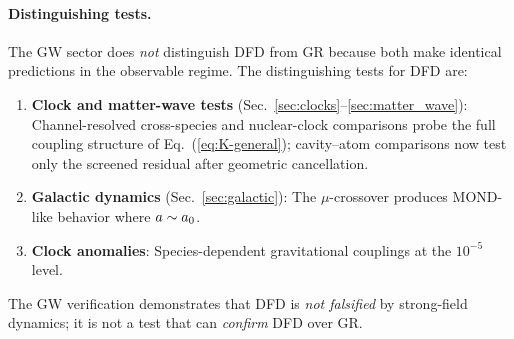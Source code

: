 \paragraph{Distinguishing tests.}
The GW sector does \textit{not} distinguish DFD from GR because both make identical predictions in the observable regime. The distinguishing tests for DFD are:

\begin{enumerate}
\item \textbf{Clock and matter-wave tests} (Sec.~\ref{sec:clocks}--\ref{sec:matter_wave}): Channel-resolved cross-species and nuclear-clock comparisons probe the full coupling structure of Eq.~(\ref{eq:K-general}); cavity--atom comparisons now test only the screened residual after geometric cancellation.

\item \textbf{Galactic dynamics} (Sec.~\ref{sec:galactic}): The $\mu$-crossover produces MOND-like behavior where $a \sim a_0$.

\item \textbf{Clock anomalies}: Species-dependent gravitational couplings at the $10^{-5}$ level.
\end{enumerate}

The GW verification demonstrates that DFD is \textit{not falsified} by strong-field dynamics; it is not a test that can \textit{confirm} DFD over GR.
